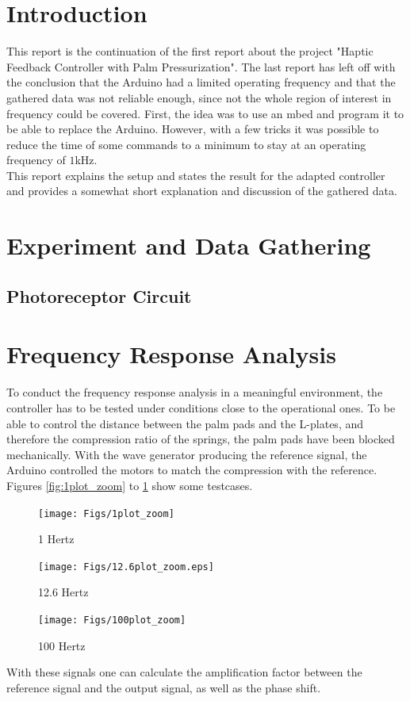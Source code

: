 	\section{Introduction}
	This report is the continuation of the first report about the project "Haptic Feedback Controller with Palm Pressurization". The last report has left off with the conclusion that the Arduino had a limited operating frequency and that the gathered data was not reliable enough, since not the whole region of interest in frequency could be covered. First, the idea was to use an mbed and program it to be able to replace the Arduino. However, with a few tricks %
	it was possible to reduce the time of some commands to a minimum to stay at an operating frequency of $1$kHz. \\
	This report explains the setup and states the result for the adapted controller and provides a somewhat short explanation and discussion of the gathered data.
	
	\section{Experiment and Data Gathering}
	
	
	
	
	
	\subsection{Photoreceptor Circuit}
	
	
	\section{Frequency Response Analysis}
	To conduct the frequency response analysis in a meaningful environment, the controller has to be tested under conditions close to the operational ones. To be able to control the distance between the palm pads and the L-plates, and therefore the compression ratio of the springs, the palm pads have been blocked mechanically. With the wave generator producing the reference signal, the Arduino controlled the motors to match the compression with the reference. Figures \ref{fig:1plot_zoom} to \ref{fig:100plot_zoom} show some testcases.
	
	
	\begin{figure}[!htb]
		\texttt{[image: Figs/1plot\_zoom]}
		\caption{1 Hertz}\label{fig:1plot_zoom}
		\endminipage\hfill
		\texttt{[image: Figs/12.6plot\_zoom.eps]}
		\caption{12.6 Hertz}\label{fig:12.6plot_zoom}
		\endminipage\hfill
		\texttt{[image: Figs/100plot\_zoom]}
		\caption{100 Hertz}\label{fig:100plot_zoom}
		\endminipage
	\end{figure}
	With these signals one can calculate the amplification factor between the reference signal and the output signal, as well as the phase shift.
	
